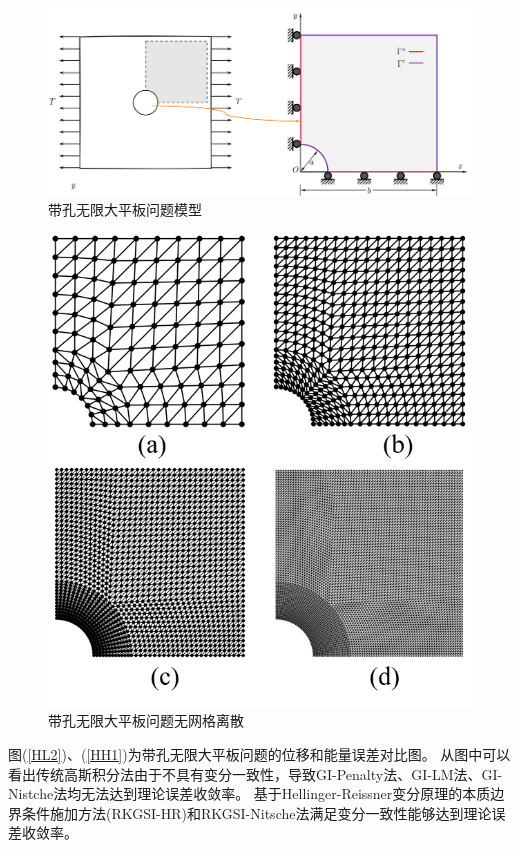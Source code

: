 \begin{figure}[!h]
\centering
\includegraphics[scale=0.5]{figure/hole/hole.png}
    \caption{带孔无限大平板问题模型}\label{hole}
\end{figure}
\begin{figure}[!h]
\centering
 \includegraphics[scale=0.7]{figure/hole/hole.msh.png}
   \caption{带孔无限大平板问题无网格离散}\label{hole.msh}
\end{figure}\newpage
图(\ref{HL2})、(\ref{HH1})为带孔无限大平板问题的位移和能量误差对比图。
从图中可以看出传统高斯积分法由于不具有变分一致性，导致GI-Penalty法、GI-LM法、GI-Nistche法均无法达到理论误差收敛率。
基于Hellinger-Reissner变分原理的本质边界条件施加方法(RKGSI-HR)和RKGSI-Nitsche法满足变分一致性能够达到理论误差收敛率。
